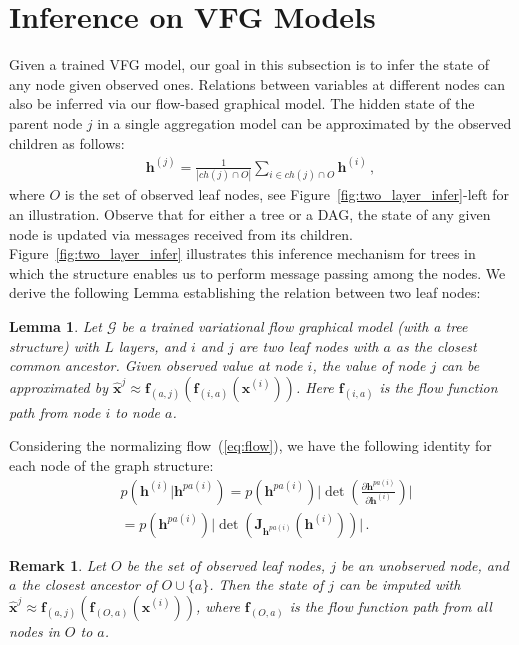 \documentclass[twoside]{article}
\newtheorem{lemma}{Lemma}
\newtheorem{remark}{Remark}
\begin{document}
\section{Inference on VFG Models }\label{sec:infer}
Given a trained VFG model, our goal in this subsection is to infer the state of any node given observed ones. 
Relations between variables at different nodes can also be inferred via our flow-based graphical model. 
The hidden state of the parent node $j$ in a single aggregation model can be approximated by the observed children as follows:
 \begin{align}\label{eq:aggr_obs_ch}
\mathbf{h}^{(j)}  = \frac{1}{|ch(j) \cap O|}\sum_{i \in ch(j) \cap O} \mathbf{h}^{(i)} \, ,
\end{align}%
where $O$ is the set of observed leaf nodes, see Figure~\ref{fig:two_layer_infer}-left for an illustration. 
Observe that for either a tree or a DAG, the state of any given node is updated via messages received from its children. Figure~\ref{fig:two_layer_infer} illustrates this inference mechanism for trees in which the structure enables us to perform message passing among the nodes. 
We derive the following Lemma establishing the relation between two leaf nodes:
\begin{lemma}\label{lm:apprx}
Let $\mathcal{G}$ be a trained variational flow graphical model (with a tree structure) with $L$ layers, and $i$ and $j$ are two leaf nodes with $a$ as the closest common ancestor. Given observed value at node $i$, the value of node $j$ can be approximated by   $\widehat{\mathbf{x}}^{j} \approx  \mathbf{f}_{(a,j)}(\mathbf{f}_{(i, a)}(\mathbf{x}^{(i)}))$. Here $\mathbf{f}_{(i, a)}$ is the flow function path from node $i$ to node $a$. 
\end{lemma}
Considering the normalizing flow~(\ref{eq:flow}), we have the following identity for each node of the graph structure:
\begin{align*}
& p(\mathbf{h}^{(i)} | \mathbf{h}^{pa(i)})  = p(\mathbf{h}^{pa(i)}) \big|\det(\frac{\partial \mathbf{h}^{pa(i)} }{\partial \mathbf{h}^{(i)}})\big| \\
& =
p(\mathbf{h}^{pa(i)}) \big|\det(\mathbf{J}_{\mathbf{h}^{pa(i)}}(\mathbf{h}^{(i)}))\big| \, .
\end{align*}
\begin{remark}\label{rmk:apprx_mul}
Let $O$ be the set of observed leaf nodes, $j$ be an unobserved node, and $a$ the closest ancestor of $O \cup \{a\}$. 
Then the state of $j$ can be imputed with $\widehat{\mathbf{x}}^{j} \approx  \mathbf{f}_{(a,j)}(\mathbf{f}_{(O, a)}(\mathbf{x}^{(i)}))$, where $\mathbf{f}_{(O, a)}$ is the flow function path from all nodes in $O$ to $a$.
\end{remark}
\vspace{-0.1in}
\end{document}
